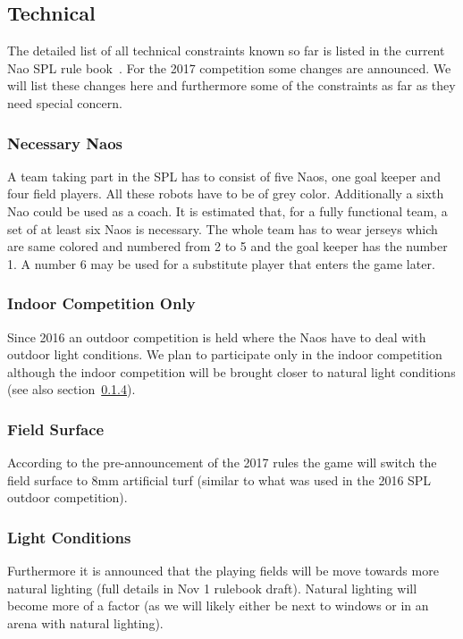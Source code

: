 \documentclass[12pt]{article}
\theoremstyle{definition}
\begin{document}
\subsection{Technical}\label{sec:technical}
The detailed list of all technical constraints known so far is listed in the current Nao SPL rule book~\cite{robocup_technical_committee_robocup_2016}. For the 2017 competition some changes are announced. We will list these changes here and furthermore some of the constraints as far as they need special concern.

\subsubsection{Necessary Naos}
A team taking part in the SPL has to consist of five Naos, one goal keeper and four field players. All these robots have to be of grey color. Additionally a sixth Nao could be used as a coach. It is estimated that, for a fully functional team, a set of at least six Naos is necessary. The whole team has to wear jerseys which are same colored and numbered from 2 to 5 and the goal keeper has the number 1. A number 6 may be used for a substitute player that enters the game later.

\subsubsection{Indoor Competition Only}
Since 2016 an outdoor competition is held where the Naos have to deal with outdoor light conditions. We plan to participate only in the indoor competition although the indoor competition will be brought closer to natural light conditions (see also section~\ref{sec:light}).

\subsubsection{Field Surface}
According to the pre-announcement of the 2017 rules the game will switch the field surface to 8mm artificial turf (similar to what was used in the 2016 SPL outdoor competition).

\subsubsection{Light Conditions}\label{sec:light}
Furthermore it is announced that the playing fields will be move towards more natural lighting (full details in Nov 1 rulebook draft). Natural lighting will become more of a factor (as we will likely either be next to windows or in an arena with natural lighting).
\end{document}
